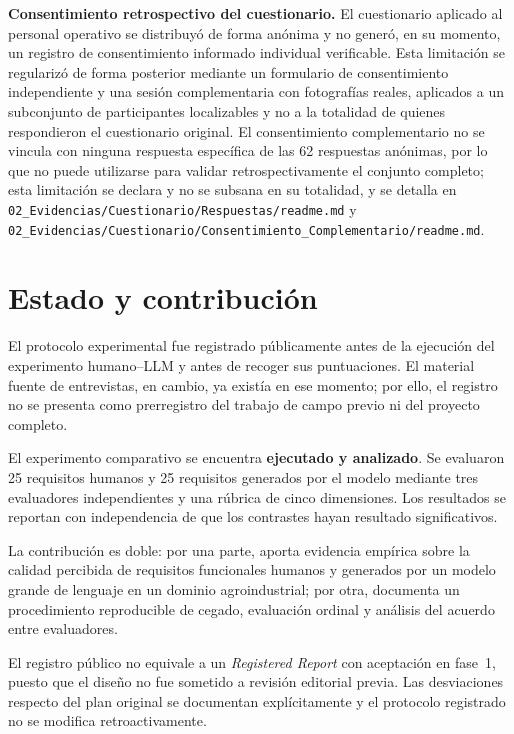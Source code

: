 \documentclass[runningheads]{llncs}
\begin{document}
\textbf{Consentimiento retrospectivo del cuestionario.} El cuestionario aplicado
al personal operativo se distribuy\'o de forma an\'onima y no gener\'o, en su
momento, un registro de consentimiento informado individual verificable. Esta
limitaci\'on se regulariz\'o de forma posterior mediante un formulario de
consentimiento independiente y una sesi\'on complementaria con fotograf\'ias
reales, aplicados a un subconjunto de participantes localizables y no a la
totalidad de quienes respondieron el cuestionario original. El consentimiento
complementario no se vincula con ninguna respuesta espec\'ifica de las 62
respuestas an\'onimas, por lo que no puede utilizarse para validar
retrospectivamente el conjunto completo; esta limitaci\'on se declara y no se
subsana en su totalidad, y se detalla en
\texttt{02\_Evidencias/Cuestionario/Respuestas/readme.md} y
\texttt{02\_Evidencias/Cuestionario/Consentimiento\_Complementario/readme.md}.
\section{Estado y contribuci\'on}
\label{sec:estado}

El protocolo experimental fue registrado p\'ublicamente antes de la ejecuci\'on
del experimento humano--LLM y antes de recoger sus puntuaciones. El material
fuente de entrevistas, en cambio, ya exist\'ia en ese momento; por ello, el
registro no se presenta como prerregistro del trabajo de campo previo ni del
proyecto completo.

El experimento comparativo se encuentra \textbf{ejecutado y analizado}. Se
evaluaron 25 requisitos humanos y 25 requisitos generados por el modelo mediante
tres evaluadores independientes y una r\'ubrica de cinco dimensiones. Los
resultados se reportan con independencia de que los contrastes hayan resultado
significativos.

La contribuci\'on es doble: por una parte, aporta evidencia emp\'irica sobre la
calidad percibida de requisitos funcionales humanos y generados por un modelo
grande de lenguaje en un dominio agroindustrial; por otra, documenta un
procedimiento reproducible de cegado, evaluaci\'on ordinal y an\'alisis del acuerdo
entre evaluadores.

El registro p\'ublico no equivale a un \emph{Registered Report} con aceptaci\'on
en fase~1, puesto que el dise\~no no fue sometido a revisi\'on editorial previa.
Las desviaciones respecto del plan original se documentan expl\'icitamente y el
protocolo registrado no se modifica retroactivamente.
\end{document}
